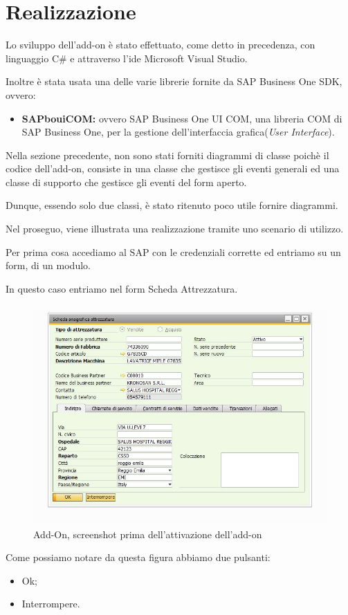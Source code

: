 \newpage

\section{Realizzazione}
\begin{flushleft}
	Lo sviluppo dell'add-on è stato effettuato, come detto in precedenza, con linguaggio C\# e attraverso l'\gls{ide} Microsoft Visual Studio.
	
	Inoltre è stata usata una delle varie librerie fornite da SAP Business One SDK, ovvero:
	\begin{itemize}
		\item \textbf{SAPbouiCOM:} ovvero SAP Business One UI COM, una libreria COM di SAP Business One, per la gestione dell'interfaccia grafica(\emph{User Interface}).
	\end{itemize}
	Nella sezione precedente, non sono stati forniti diagrammi di classe poichè il codice dell'add-on, consiste in una classe che gestisce gli eventi generali ed una classe di supporto che gestisce gli eventi del form aperto.
	
	Dunque, essendo solo due classi, è stato ritenuto poco utile fornire diagrammi.
	
	\vspace{1em}
	Nel proseguo, viene illustrata una realizzazione tramite uno scenario di utilizzo.
\end{flushleft}
\begin{flushleft}
	Per prima cosa accediamo al SAP con le credenziali corrette ed entriamo su un form, di un modulo.
	
	In questo caso entriamo nel form Scheda Attrezzatura.
	
\end{flushleft}
\begin{figure}[!h] 
	\centering 
	\includegraphics[scale = 0.6]{immagini/add-on/addon-scheda-nobutton.jpg} 
	\caption{Add-On, screenshot prima dell'attivazione dell'add-on}
\end{figure}
Come possiamo notare da questa figura abbiamo due pulsanti:
\begin{itemize}
	\item Ok;
	\item Interrompere.
\end{itemize}

